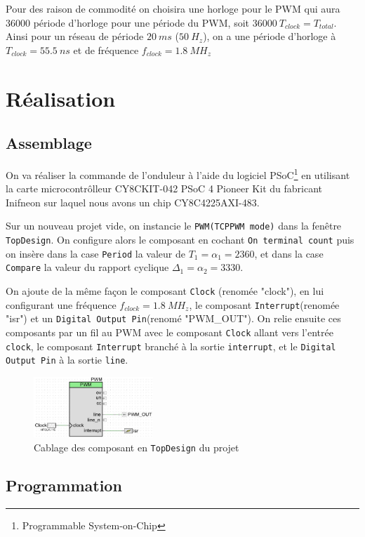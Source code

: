 \documentclass[11pt, openright]{book}
\begin{document}
Pour des raison de commodité on choisira une horloge pour le PWM qui aura 36000 période d'horloge pour une période du PWM, soit $36000\ T_{clock}= T_{total}$. Ainsi pour un réseau de période $20\ ms$ ($50\ H_z$), on a une période d'horloge à $T_{clock}=55.5\ ns$ et de fréquence $f_{clock}=1.8\ MH_z$

\section{Réalisation}

\subsection{Assemblage}

On va réaliser la commande de l'onduleur à l'aide du logiciel PSoC\footnote{Programmable System-on-Chip} en utilisant la carte microcontrôlleur CY8CKIT-042 PSoC 4 Pioneer Kit du fabricant Inifneon sur laquel nous avons un chip CY8C4225AXI-483.

Sur un nouveau projet vide, on instancie le \texttt{PWM(TCPPWM mode)} dans la fenêtre \texttt{TopDesign}. On configure alors le composant en cochant \texttt{On terminal count} puis on insère dans la case \texttt{Period} la valeur de $T_1=\alpha_1 = 2360$, et dans la case \texttt{Compare} la valeur du rapport cyclique $\Delta_1=\alpha_2 = 3330$.

On ajoute de la même façon le composant \texttt{Clock} (renomée "clock"), en lui configurant une fréquence $f_{clock}=1.8\ MH_z$, le composant \texttt{Interrupt}(renomée "isr") et un \texttt{Digital Output Pin}(renomé "PWM\_OUT"). On relie ensuite ces composants par un fil au PWM avec le composant \texttt{Clock} allant vers l'entrée \texttt{clock}, le composant \texttt{Interrupt} branché à la sortie \texttt{interrupt}, et le \texttt{Digital Output Pin} à la sortie \texttt{line}.

\begin{figure}[ht!]
	\centering
	\includegraphics[width=0.4\textwidth]{./object/c2.png}
	\caption{Cablage des composant en \texttt{TopDesign} du projet}
\end{figure}

\subsection{Programmation}
\end{document}
